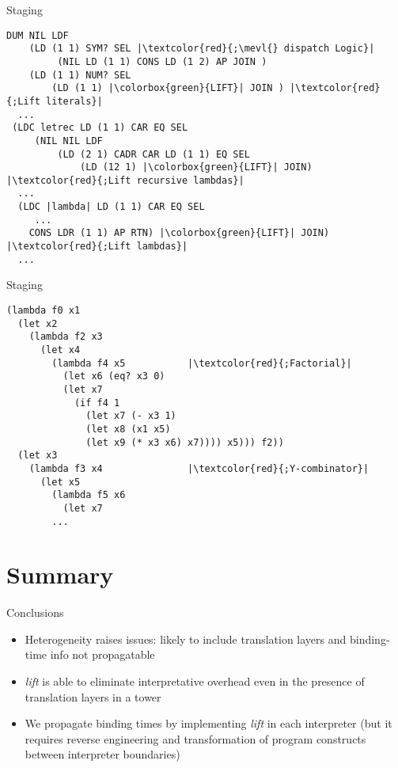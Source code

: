 \documentclass{beamer}
\begin{document}
\begin{frame}[fragile]{Staging \texorpdfstring{\mevl}{}}
         \begin{verbatim}
DUM NIL LDF
    (LD (1 1) SYM? SEL |\textcolor{red}{;\mevl{} dispatch Logic}|
         (NIL LD (1 1) CONS LD (1 2) AP JOIN )
    (LD (1 1) NUM? SEL
        (LD (1 1) |\colorbox{green}{LIFT}| JOIN ) |\textcolor{red}{;Lift literals}|
  ...
 (LDC letrec LD (1 1) CAR EQ SEL
     (NIL NIL LDF
         (LD (2 1) CADR CAR LD (1 1) EQ SEL
             (LD (12 1) |\colorbox{green}{LIFT}| JOIN) |\textcolor{red}{;Lift recursive lambdas}|
  ...
  (LDC |lambda| LD (1 1) CAR EQ SEL
     ...
    CONS LDR (1 1) AP RTN) |\colorbox{green}{LIFT}| JOIN) |\textcolor{red}{;Lift lambdas}|
  ...
         \end{verbatim}
\end{frame}

\begin{frame}[fragile]{Staging \texorpdfstring{\mevl}{}}
     \begin{verbatim}
(lambda f0 x1
  (let x2
    (lambda f2 x3
      (let x4
        (lambda f4 x5           |\textcolor{red}{;Factorial}|
          (let x6 (eq? x3 0)
          (let x7
            (if f4 1
              (let x7 (- x3 1)
              (let x8 (x1 x5)
              (let x9 (* x3 x6) x7)))) x5))) f2))
  (let x3
    (lambda f3 x4               |\textcolor{red}{;Y-combinator}|
      (let x5
        (lambda f5 x6
          (let x7
        ...
         \end{verbatim}
\end{frame}


\section{Summary}
\begin{frame}{Conclusions}
    \begin{itemize}
        \item Heterogeneity raises issues: likely to include translation layers and binding-time info not propagatable
        \item \textit{lift} is able to eliminate interpretative overhead even in the presence of translation layers in a tower
        \item We propagate binding times by implementing \textit{lift} in each interpreter (but it requires reverse engineering and transformation of program constructs between interpreter boundaries)
    \end{itemize}
\end{frame}
\end{document}
